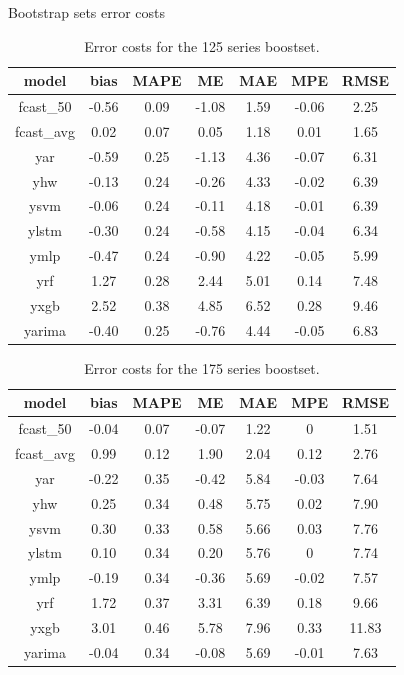 \documentclass[opre,sglanonrev,11pt]{informs4}
\begin{document}
\begin{APPENDIX}{Bootstrap sets error costs}
\begin{table}
	\centering
	\renewcommand{\arraystretch}{0.75}
	\begin{tabular}{ccccccc}
		model & bias & MAPE & ME & MAE & MPE & RMSE \\
		\hline
		fcast\_50   & -0.56 & 0.09 & -1.08 & 1.59 & -0.06 & 2.25  \\
		fcast\_avg  &  0.02 & 0.07 &  0.05 & 1.18 &  0.01 & 1.65  \\
		yar         & -0.59 & 0.25 & -1.13 & 4.36 & -0.07 & 6.31  \\
		yhw         & -0.13 & 0.24 & -0.26 & 4.33 & -0.02 & 6.39  \\
		ysvm        & -0.06 & 0.24 & -0.11 & 4.18 & -0.01 & 6.39  \\
		ylstm       & -0.30 & 0.24 & -0.58 & 4.15 & -0.04 & 6.34  \\
		ymlp        & -0.47 & 0.24 & -0.90 & 4.22 & -0.05 & 5.99  \\
		yrf         &  1.27 & 0.28 &  2.44 & 5.01 &  0.14 & 7.48  \\
		yxgb        &  2.52 & 0.38 &  4.85 & 6.52 &  0.28 & 9.46  \\
		yarima      & -0.40 & 0.25 & -0.76 & 4.44 & -0.05 & 6.83  \\
		\hline
	\end{tabular}
	\caption{Error costs for the 125 series boostset.}
	\label{table:app125}
\end{table}

\begin{table}
	\centering
	\renewcommand{\arraystretch}{0.75}
	\begin{tabular}{ccccccc}
		model & bias & MAPE & ME & MAE & MPE & RMSE \\
		\hline
		fcast\_50  & -0.04 & 0.07 & -0.07 & 1.22 & 0     & 1.51 \\
		fcast\_avg & 0.99  & 0.12 & 1.90  & 2.04 & 0.12  & 2.76 \\
		yar        & -0.22 & 0.35 & -0.42 & 5.84 & -0.03 & 7.64 \\
		yhw        & 0.25  & 0.34 & 0.48  & 5.75 & 0.02  & 7.90 \\
		ysvm       & 0.30  & 0.33 & 0.58  & 5.66 & 0.03  & 7.76 \\
		ylstm      & 0.10  & 0.34 & 0.20  & 5.76 & 0     & 7.74 \\
		ymlp       & -0.19 & 0.34 & -0.36 & 5.69 & -0.02 & 7.57 \\
		yrf        & 1.72  & 0.37 & 3.31  & 6.39 & 0.18  & 9.66 \\
		yxgb       & 3.01  & 0.46 & 5.78  & 7.96 & 0.33  & 11.83\\
		yarima     & -0.04 & 0.34 & -0.08 & 5.69 & -0.01 & 7.63 \\
		\hline
	\end{tabular}
	\caption{Error costs for the 175 series boostset.}
	\label{table:app175}
\end{table}

\end{APPENDIX}



\end{document}
